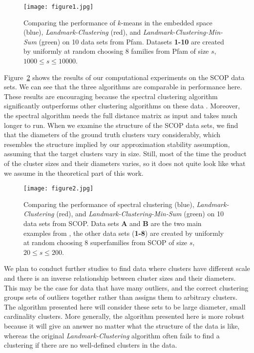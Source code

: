 \documentclass{llncs} \usepackage{algorithm}
\begin{document}
\begin{figure}
\begin{center}
\texttt{[image: figure1.jpg]}
\caption{Comparing the performance of $k$-means in the embedded space (blue), \emph{Landmark-Clustering} (red), and \emph{Landmark-Clustering-Min-Sum} (green) on 10 data sets from Pfam.  Datasets \textbf{1-10} are created by uniformly at random choosing 8 families from Pfam of size $s$, $1000 \le s \le 10000$. \label{fig:figure1}}
\end{center}
\end{figure}

Figure~\ref{fig:figure2} shows the results of our computational experiments on the SCOP data sets.  We can see that the three algorithms are comparable in performance here.  These results are encouraging because the spectral clustering algorithm significantly outperforms other clustering algorithms on these data \cite{spectralClusteringProteinSeqs}. Moreover, the spectral algorithm needs the full distance matrix as input and takes much longer to run.  When we examine the structure of the SCOP data sets, we find that the diameters of the ground truth clusters vary considerably, which resembles the structure implied by our approximation stability assumption, assuming that the target clusters vary in size.  Still, most of the time the product of the cluster sizes and their diameters varies, so it does not quite look like what we assume in the theoretical part of this work.

\begin{figure}
\begin{center}
\texttt{[image: figure2.jpg]}
\caption{Comparing the performance of spectral clustering (blue), \emph{Landmark-Clustering} (red), and \emph{Landmark-Clustering-Min-Sum} (green) on 10 data sets from SCOP.  Data sets \textbf{A} and \textbf{B} are the two main examples from \cite{spectralClusteringProteinSeqs}, the other data sets (\textbf{1-8}) are created by uniformly at random choosing 8 superfamilies from SCOP of size $s$, $20 \le s \le 200$.
\label{fig:figure2}}
\end{center}
\end{figure}

We plan to conduct further studies to find data where clusters have different scale and there is an inverse relationship between cluster sizes and their diameters.  This may be the case for data that have many outliers, and the correct clustering groups sets of outliers together rather than assigns them to arbitrary clusters.  The algorithm presented here will consider these sets to be large diameter, small cardinality clusters.  More generally, the algorithm presented here is more robust because it will give an answer no matter what the structure of the data is like, whereas the original \emph{Landmark-Clustering} algorithm often fails to find a clustering if there are no well-defined clusters in the data.
\end{document}
